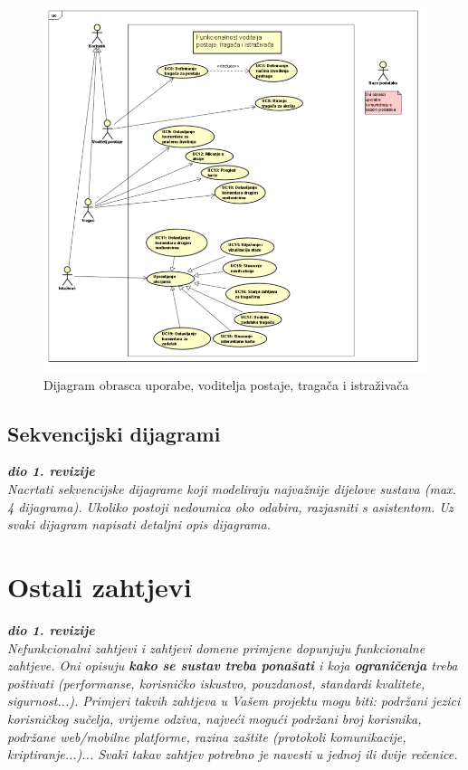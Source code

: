 					\begin{figure}[H]
						\includegraphics[scale=1]{dijagrami/voditelj-tragac-istrazivac-dijagram.PNG} 
						\centering
						\caption{Dijagram obrasca uporabe, voditelja postaje, tragača i istraživača}
						\label{fig:promjene}
					\end{figure}	
				
				
			\subsection{Sekvencijski dijagrami}
				
				\textbf{\textit{dio 1. revizije}}\\
				
				\textit{Nacrtati sekvencijske dijagrame koji modeliraju najvažnije dijelove sustava (max. 4 dijagrama). Ukoliko postoji nedoumica oko odabira, razjasniti s asistentom. Uz svaki dijagram napisati detaljni opis dijagrama.}
				\eject
	
		\section{Ostali zahtjevi}
		
			\textbf{\textit{dio 1. revizije}}\\
		 
			 \textit{Nefunkcionalni zahtjevi i zahtjevi domene primjene dopunjuju funkcionalne zahtjeve. Oni opisuju \textbf{kako se sustav treba ponašati} i koja \textbf{ograničenja} treba poštivati (performanse, korisničko iskustvo, pouzdanost, standardi kvalitete, sigurnost...). Primjeri takvih zahtjeva u Vašem projektu mogu biti: podržani jezici korisničkog sučelja, vrijeme odziva, najveći mogući podržani broj korisnika, podržane web/mobilne platforme, razina zaštite (protokoli komunikacije, kriptiranje...)... Svaki takav zahtjev potrebno je navesti u jednoj ili dvije rečenice.}
			 
			 
			 
	